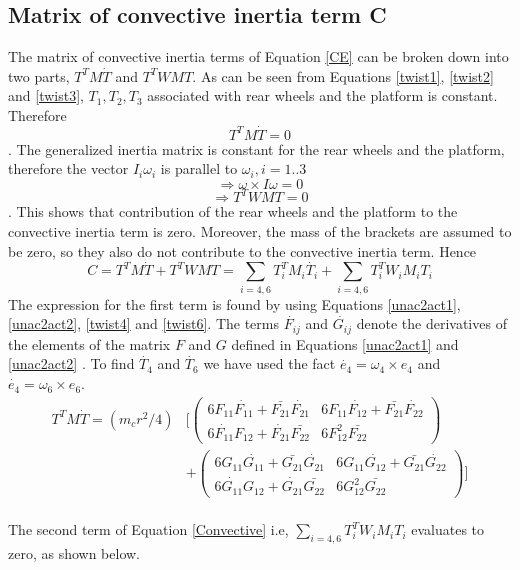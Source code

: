 \subsection{Matrix of convective inertia term C}
The matrix of convective inertia terms of Equation \ref{CE} can be broken down into two parts, $T^TM\dot{T}$ and $T^TWMT$.  As can be seen from Equations \ref{twist1}, \ref{twist2} and \ref{twist3},  $T_1,T_2,T_3$ associated with rear wheels and the platform is constant. Therefore \[T^TM\dot{T}=0\]. The generalized inertia matrix  is constant for the rear wheels and the platform, therefore the vector $I_i\omega_i$ is parallel to  $\omega_i, i=1..3$ \[\Rightarrow\omega\times I\omega=0\] \[\Rightarrow T^TWMT =0\]. This shows that contribution of the rear wheels and the platform  to the convective inertia term is zero. Moreover, the mass of the brackets are assumed to be zero, so they also do not contribute to the convective inertia term. Hence
\begin{equation}
\label{Convective}
C=T^TM\dot{T}+T^TWMT=\sum_{i=4,6}T^T_iM_i\dot{T_i}+\sum_{i=4,6}T_i^TW_iM_iT_i
\end{equation}
The expression for the first term is found by using Equations \ref{unac2act1}, \ref{unac2act2}, \ref{twist4} and \ref{twist6}. The terms $\dot{F_{ij}}$ and $\dot{G_{ij}}$ denote the derivatives of the elements of the matrix $F$ and $G$ defined in Equations \ref{unac2act1} and \ref{unac2act2} . To find $\dot{T_4}$ and  $ \dot{T_6}$ we have used the fact $\dot{e_4}=\omega_4 \times e_4 $ and $\dot{e_4}=\omega_6 \times e_6 $. 
\begin{equation}
\label{corr1}
\begin{split}
T^TM\dot{T}=
(m_cr^2/4)& \biggl[ \begin{pmatrix}
6F_{11}\dot{F_{11}}+\bar{F_{21}}\dot{F_{21}} & 6F_{11}\dot{F_{12}}+\bar{F_{21}}\dot{F_{22}}\\
6\dot{F_{11}}F_{12}+\dot{F_{21}}\bar{F_{22}} & 6F_{12}^2\bar{F_{22}}
\end{pmatrix}\\
&+\begin{pmatrix}
6G_{11}\dot{G_{11}}+\bar{G_{21}}\dot{G_{21}} & 6G_{11}\dot{G_{12}}+\bar{G_{21}}\dot{G_{22}}\\
6\dot{G_{11}}G_{12}+\dot{G_{21}}\bar{G_{22}} & 6G_{12}^2\bar{G_{22}}
\end{pmatrix} \biggr]
\end{split}
\end{equation}
\\
The second term of Equation \ref{Convective} i.e, $ \sum_{i=4,6}T_i^TW_iM_iT_i$ evaluates to zero, as shown below. 

